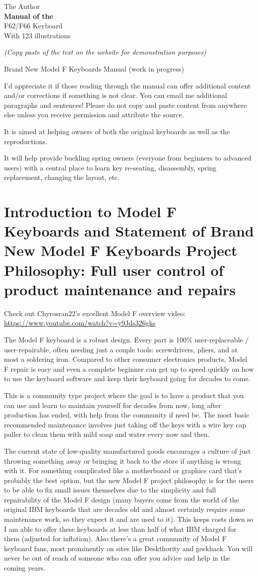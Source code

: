 \documentclass[a5paper, twoside]{memoir}
\newcommand*{\plogo}{\fbox{$\mathcal{PL}$}}
\newcommand*{\titleTH}{\begingroup %
\raggedleft
\vspace*{\baselineskip}
{\Large The Author}\\[0.167\textheight]
{\bfseries Manual of the}\\[\baselineskip]
{{\Huge F62/F66 Keyboard}}\\[\baselineskip]
{\small With 123 illustrations}\par
\vfill
\vspace*{3\baselineskip}
\endgroup}
\begin{document}
\pagestyle{empty}
\titleTH
\clearpage

\emph{(Copy paste of the text on the website for demonstration purposes)}

Brand New Model F Keyboards Manual (work in progress)

I’d appreciate it if those reading through the manual can offer additional content and/or corrections if something is not clear.   You can email me additional paragraphs and sentences!  Please do not copy and paste content from anywhere else unless you receive permission and attribute the source.

It is aimed at helping owners of both the original keyboards as well as the reproductions.

It will help provide buckling spring owners (everyone from beginners to advanced users) with a central place to learn key re-seating, disassembly, spring replacement, changing the layout, etc.

\section{Introduction to Model F Keyboards and Statement of Brand New Model F Keyboards Project Philosophy: Full user control of product maintenance and repairs}

    Check out Chyrosran22’s excellent Model F overview video:  \url{https://www.youtube.com/watch?v=y9Jds326gks}

    The Model F keyboard is a robust design. Every part is 100\% user-replaceable / user-repairable, often needing just a couple tools: screwdrivers, pliers, and at most a soldering iron. Compared to other consumer electronics products, Model F repair is easy and even a complete beginner can get up to speed quickly on how to use the keyboard software and keep their keyboard going for decades to come.

    This is a community type project where the goal is to have a product that you can use and learn to maintain yourself for decades from now, long after production has ended, with help from the community if need be. The most basic recommended maintenance involves just taking off the keys with a wire key cap puller to clean them with mild soap and water every now and then.

    The current state of low-quality manufactured goods encourages a culture of just throwing something away or bringing it back to the store if anything is wrong with it.  For something complicated like a motherboard or graphics card that’s probably the best option, but the new Model F project philosophy is for the users to be able to fix small issues themselves due to the simplicity and full repairability of the Model F design (many buyers come from the world of the original IBM keyboards that are decades old and almost certainly require some maintenance work, so they expect it and are used to it). This keeps costs down so I am able to offer these keyboards at less than half of what IBM charged for them (adjusted for inflation). Also there’s a great community of Model F keyboard fans, most prominently on sites like Deskthority and geekhack. You will never be out of reach of someone who can offer you advice and help in the coming years.
\end{document}
